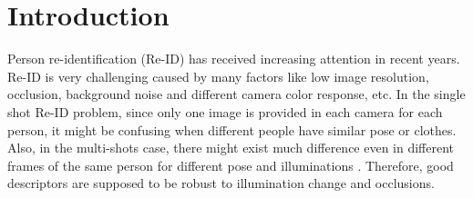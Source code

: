 \documentclass[conference,compsoc]{IEEEtran}
\begin{document}




%
\IEEEpeerreviewmaketitle



\section{Introduction}
Person re-identification (Re-ID) has received increasing attention in recent years. Re-ID is very challenging caused by many factors like low image resolution, occlusion, background noise and different camera color response, etc. In the single shot Re-ID problem, since only one image is provided in each camera for each person, it might be confusing when different people have similar pose or clothes. Also, in the multi-shots case, there might exist much difference even in different frames of the same person for different pose and illuminations \cite{TDL}. Therefore, good descriptors are supposed to be robust to illumination change and occlusions.
\end{document}
